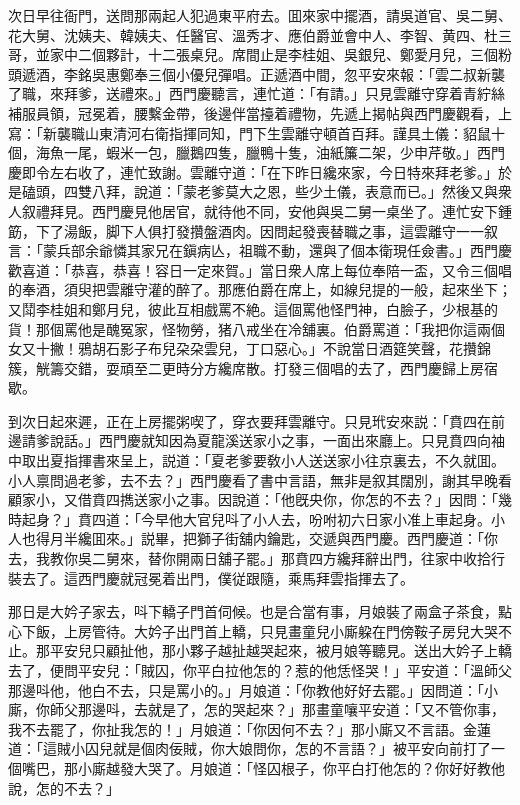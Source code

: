 次日早往衙門，送問那兩起人犯過東平府去。囬來家中擺酒，請吳道官、吳二舅、花大舅、沈姨夫、韓姨夫、任醫官、溫秀才、應伯爵並會中人、李智、黄四、杜三哥，並家中二個夥計，十二張桌兒。席間止是李桂姐、吳銀兒、鄭愛月兒，三個粉頭遞酒，李銘吳惠鄭奉三個小優兒彈唱。正遞酒中間，忽平安來報：「雲二叔新襲了職，來拜爹，送禮來。」西門慶聽言，連忙道：「有請。」只見雲離守穿着青紵絲補服員領，冠冕着，腰繫金帶，後邊伴當擡着禮物，先遞上揭帖與西門慶觀看，上寫：「新襲職山東清河右衛指揮同知，門下生雲離守頓首百拜。謹具土儀：貂鼠十個，海魚一尾，蝦米一包，臘鵝四隻，臘鴨十隻，油紙簾二架，少申芹敬。」西門慶即令左右收了，連忙致謝。雲離守道：「在下昨日纔來家，今日特來拜老爹。」於是磕頭，四雙八拜，說道：「蒙老爹莫大之恩，些少土儀，表意而已。」然後又與衆人叙禮拜見。西門慶見他居官，就待他不同，安他與吳二舅一桌坐了。連忙安下鍾筯，下了湯飯，脚下人俱打發攢盤酒肉。因問起發喪替職之事，這雲離守一一叙言：「蒙兵部余爺憐其家兄在鎭病亾，祖職不動，還與了個本衛現任僉書。」西門慶歡喜道：「恭喜，恭喜！容日一定來賀。」當日衆人席上每位奉陪一盃，又令三個唱的奉酒，須臾把雲離守灌的醉了。那應伯爵在席上，如線兒提的一般，起來坐下；又鬦李桂姐和鄭月兒，彼此互相戲罵不絶。這個罵他怪門神，白臉子，少根基的貨！那個罵他是醜冤家，怪物勞，猪八戒坐在冷舖裏。伯爵罵道：「我把你這兩個女又十撇！鴉胡石影子布兒朶朶雲兒，丁口惡心。」不說當日酒筵笑聲，花攢錦簇，觥籌交錯，耍頑至二更時分方纔席散。打發三個唱的去了，西門慶歸上房宿歇。

到次日起來遲，正在上房擺粥喫了，穿衣要拜雲離守。只見玳安來説：「賁四在前邊請爹說話。」西門慶就知因為夏龍溪送家小之事，一面出來廳上。只見賁四向袖中取出夏指揮書來呈上，説道：「夏老爹要敎小人送送家小往京裏去，不久就囬。小人禀問過老爹，去不去？」西門慶看了書中言語，無非是叙其闊別，謝其早晚看顧家小，又借賁四擕送家小之事。因說道：「他旣央你，你怎的不去？」因問：「幾時起身？」賁四道：「今早他大官兒呌了小人去，吩咐初六日家小准上車起身。小人也得月半纔囬來。」説畢，把獅子街舖内鑰匙，交遞與西門慶。西門慶道：「你去，我教你吳二舅來，替你開兩日舖子罷。」那賁四方纔拜辭出門，往家中收拾行裝去了。這西門慶就冠冕着出門，僕従跟隨，乘馬拜雲指揮去了。

那日是大妗子家去，呌下轎子門首伺候。也是合當有事，月娘裝了兩盒子茶食，點心下飯，上房管待。大妗子出門首上轎，只見畫童兒小廝躱在門傍鞍子房兒大哭不止。那平安兒只顧扯他，那小夥子越扯越哭起來，被月娘等聽見。送出大妗子上轎去了，便問平安兒：「賊囚，你平白拉他怎的？惹的他恁怪哭！」平安道：「溫師父那邊呌他，他白不去，只是罵小的。」月娘道：「你教他好好去罷。」因問道：「小廝，你師父那邊呌，去就是了，怎的哭起來？」那畫童嚷平安道：「又不管你事，我不去罷了，你扯我怎的！」月娘道：「你因何不去？」那小廝又不言語。金蓮道：「這賊小囚兒就是個肉佞賊，你大娘問你，怎的不言語？」被平安向前打了一個嘴巴，那小廝越發大哭了。月娘道：「怪囚根子，你平白打他怎的？你好好教他說，怎的不去？」

